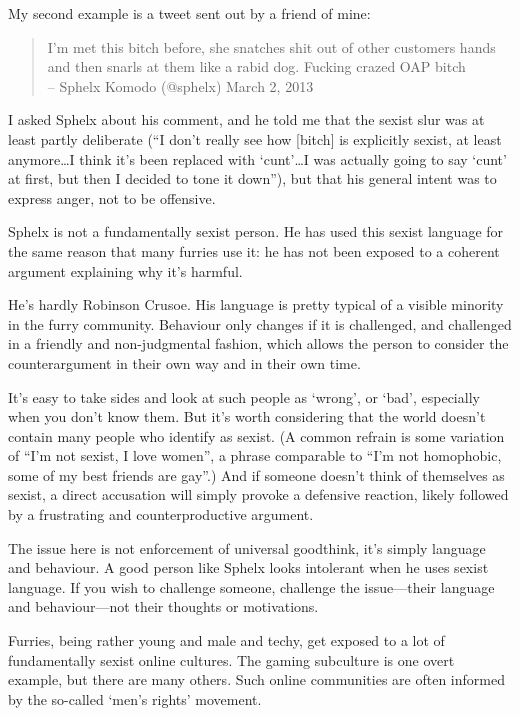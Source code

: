 My second example is a tweet sent out by a friend of mine:

\begin{quotation}
  I'm met this bitch before, she snatches shit out of other customers hands and then snarls at them like a rabid dog. Fucking crazed OAP bitch\\
  -- Sphelx Komodo (@sphelx) March 2, 2013
\end{quotation}

I asked Sphelx about his comment, and he told me that the sexist slur was at least partly deliberate (``I don't really see how [bitch] is explicitly sexist, at least anymore\ldots I think it's been replaced with `cunt'\ldots I was actually going to say `cunt' at first, but then I decided to tone it down''), but that his general intent was to express anger, not to be offensive.

Sphelx is not a fundamentally sexist person. He has used this sexist language for the same reason that many furries use it: he has not been exposed to a coherent argument explaining why it's harmful.

He's hardly Robinson Crusoe. His language is pretty typical of a visible minority in the furry community. Behaviour only changes if it is challenged, and challenged in a friendly and non-judgmental fashion, which allows the person to consider the counterargument in their own way and in their own time.

It's easy to take sides and look at such people as `wrong', or `bad', especially when you don't know them. But it's worth considering that the world doesn't contain many people who identify as sexist. (A common refrain is some variation of “I'm not sexist, I love women”, a phrase comparable to “I'm not homophobic, some of my best friends are gay”.) And if someone doesn't think of themselves as sexist, a direct accusation will simply provoke a defensive reaction, likely followed by a frustrating and counterproductive argument.

The issue here is not enforcement of universal goodthink, it's simply language and behaviour. A good person like Sphelx looks intolerant when he uses sexist language. If you wish to challenge someone, challenge the issue—their language and behaviour—not their thoughts or motivations.

Furries, being rather young and male and techy, get exposed to a lot of fundamentally sexist online cultures. The gaming subculture is one overt example, but there are many others. Such online communities are often informed by the so-called `men's rights' movement.


